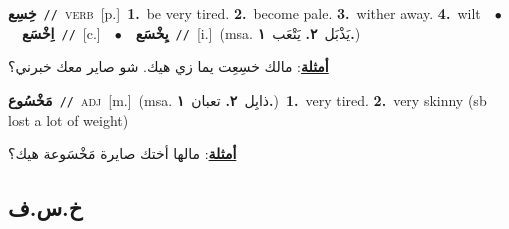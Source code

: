 \documentclass[10pt,a4paper,twoside]{article} %
\begin{document}
\begin{multicols}{2}
{\setlength\topsep{0pt}\textbf{\foreignlanguage{arabic}{خِسِع}}\ {\color{gray}\texttt{//}\color{black}}\ \textsc{verb}\ [p.]\ \textbf{1.}~be very tired.  \textbf{2.}~become pale.  \textbf{3.}~wither away.  \textbf{4.}~wilt\ \ $\bullet$\ \ \setlength\topsep{0pt}\textbf{\foreignlanguage{arabic}{اِخْسَع}}\ {\color{gray}\texttt{//}\color{black}}\ [c.]\ \ $\bullet$\ \ \setlength\topsep{0pt}\textbf{\foreignlanguage{arabic}{يِخْسَع}}\ {\color{gray}\texttt{//}\color{black}}\ [i.]\ \color{gray}(msa. \foreignlanguage{arabic}{يَذْبَل}~\foreignlanguage{arabic}{\textbf{٢.}}  \foreignlanguage{arabic}{يَتْعَب}~\foreignlanguage{arabic}{\textbf{١.}})\color{black}\  \begin{flushright}\color{gray}\foreignlanguage{arabic}{\textbf{\underline{\foreignlanguage{arabic}{أمثلة}}}: مالك خسِعِت يما زي هيك. شو صاير معك خبرني؟}\end{flushright}\color{black}} \vspace{2mm}

{\setlength\topsep{0pt}\textbf{\foreignlanguage{arabic}{مَخْسُوع}}\ {\color{gray}\texttt{//}\color{black}}\ \textsc{adj}\ [m.]\ \color{gray}(msa. \foreignlanguage{arabic}{ذابِل}~\foreignlanguage{arabic}{\textbf{٢.}}  \foreignlanguage{arabic}{تعبان}~\foreignlanguage{arabic}{\textbf{١.}})\color{black}\ \textbf{1.}~very tired.  \textbf{2.}~very skinny (sb lost a lot of weight)\  \begin{flushright}\color{gray}\foreignlanguage{arabic}{\textbf{\underline{\foreignlanguage{arabic}{أمثلة}}}: مالها أختك صايرة مَخْسَوعة هيك؟}\end{flushright}\color{black}} \vspace{2mm}

\vspace{-3mm}
\subsection*{\color{blue}\foreignlanguage{arabic}{خ.س.ف}\color{blue}{}} 


\end{multicols}
\end{document}
